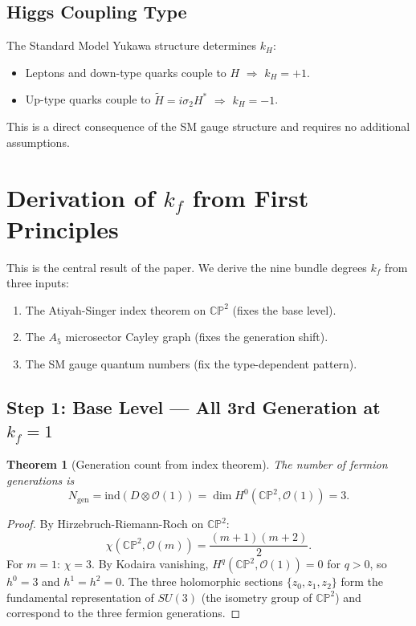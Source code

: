 \documentclass[11pt,a4paper]{article}
\newcommand{\CP}{\mathbb{CP}}
\newcommand{\ind}{\mathrm{ind}}
\newtheorem{theorem}{Theorem}
\theoremstyle{definition}
\theoremstyle{remark}
\begin{document}
\subsection{Higgs Coupling Type}

The Standard Model Yukawa structure determines $k_H$:
\begin{itemize}
\item Leptons and down-type quarks couple to $H$ $\Rightarrow$ $k_H = +1$.
\item Up-type quarks couple to $\tilde{H} = i\sigma_2 H^*$ $\Rightarrow$ $k_H = -1$.
\end{itemize}

This is a direct consequence of the SM gauge structure and requires no
additional assumptions.

\section{Derivation of $k_f$ from First Principles}
\label{sec:kf}

This is the central result of the paper.  We derive the nine bundle
degrees $k_f$ from three inputs:

\begin{enumerate}
\item The Atiyah-Singer index theorem on $\CP^2$ (fixes the base level).
\item The $A_5$ microsector Cayley graph (fixes the generation shift).
\item The SM gauge quantum numbers (fix the type-dependent pattern).
\end{enumerate}

\subsection{Step 1: Base Level --- All 3rd Generation at $k_f = 1$}

\begin{theorem}[Generation count from index theorem]
\label{thm:base}
The number of fermion generations is
\begin{equation}
N_{\mathrm{gen}} = \ind(D \otimes \mathcal{O}(1)) = \dim H^0(\CP^2, \mathcal{O}(1)) = 3.
\end{equation}
\end{theorem}

\begin{proof}
By Hirzebruch-Riemann-Roch on $\CP^2$:
\[
\chi(\CP^2, \mathcal{O}(m)) = \frac{(m+1)(m+2)}{2}.
\]
For $m = 1$: $\chi = 3$.  By Kodaira vanishing, $H^q(\CP^2, \mathcal{O}(1)) = 0$
for $q > 0$, so $h^0 = 3$ and $h^1 = h^2 = 0$.  The three holomorphic
sections $\{z_0, z_1, z_2\}$ form the fundamental representation of
$SU(3)$ (the isometry group of $\CP^2$) and correspond to the three
fermion generations.
\end{proof}
\end{document}
